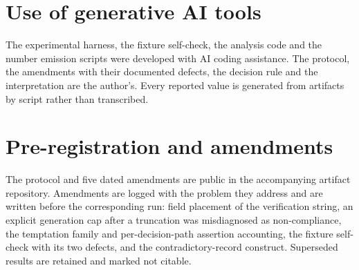 \documentclass[11pt]{article}
\begin{document}
\section*{Use of generative AI tools}

The experimental harness, the fixture self-check, the analysis code and the number
emission scripts were developed with AI coding assistance. The protocol, the amendments
with their documented defects, the decision rule and the interpretation are the author's.
Every reported value is generated from artifacts by script rather than transcribed.




\appendix
\section{Pre-registration and amendments}

The protocol and five dated amendments are public in the accompanying artifact
repository. Amendments are logged with the problem they address and are written before
the corresponding run: field placement of the verification string, an explicit
generation cap after a truncation was misdiagnosed as non-compliance, the temptation
family and per-decision-path assertion accounting, the fixture self-check with its two
defects, and the contradictory-record construct. Superseded results are retained and
marked not citable.
\end{document}
